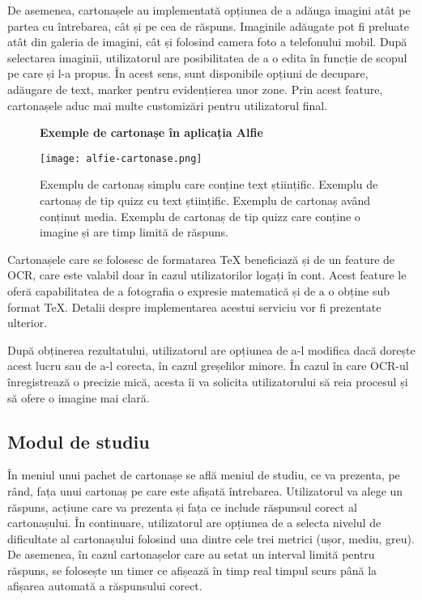 De asemenea, cartonașele au implementată opțiunea de a adăuga imagini atât pe partea cu întrebarea, cât și pe cea de răspuns. Imaginile adăugate pot fi preluate atât din galeria de imagini, cât și folosind camera foto a telefonului mobil. După selectarea imaginii, utilizatorul are posibilitatea de a o edita în funcție de scopul pe care și l-a propus. În acest sens, sunt disponibile opțiuni de decupare, adăugare de text, marker pentru evidențierea unor zone. Prin acest feature, cartonașele aduc mai multe customizări pentru utilizatorul final.

\begin{figure}[H]
    \centering
    \textbf{Exemple de cartonașe în aplicația Alfie}\par\medskip
    \texttt{[image: alfie-cartonase.png]}
    \caption{Exemplu de cartonaș simplu care conține text științific. Exemplu de cartonaș de tip quizz cu text științific. Exemplu de cartonaș având conținut media. Exemplu de cartonaș de tip quizz care conține o imagine și are timp limită de răspuns.}
\end{figure}

Cartonașele care se folosesc de formatarea TeX beneficiază și de un feature de OCR, care este valabil doar în cazul utilizatorilor logați în cont. Acest feature le oferă capabilitatea de a fotografia o expresie matematică și de a o obține sub format TeX. Detalii despre implementarea acestui serviciu vor fi prezentate ulterior.

După obținerea rezultatului, utilizatorul are opțiunea de a-l modifica dacă dorește acest lucru sau de a-l corecta, în cazul greșelilor minore. În cazul în care OCR-ul înregistrează o precizie mică, acesta îi va solicita utilizatorului să reia procesul și să ofere o imagine mai clară.

\subsection{Modul de studiu}

În meniul unui pachet de cartonașe se află meniul de studiu, ce va prezenta, pe rând, fața unui cartonaș pe care este afișată întrebarea. Utilizatorul va alege un răspuns, acțiune care va prezenta și fața ce include răspunsul corect al cartonașului. În continuare, utilizatorul are opțiunea de a selecta nivelul de dificultate al cartonașului folosind una dintre cele trei metrici (ușor, mediu, greu). De asemenea, în cazul cartonașelor care au setat un interval limită pentru răspuns, se folosește un timer ce afișează în timp real timpul scurs până la afișarea automată a răspunsului corect.


